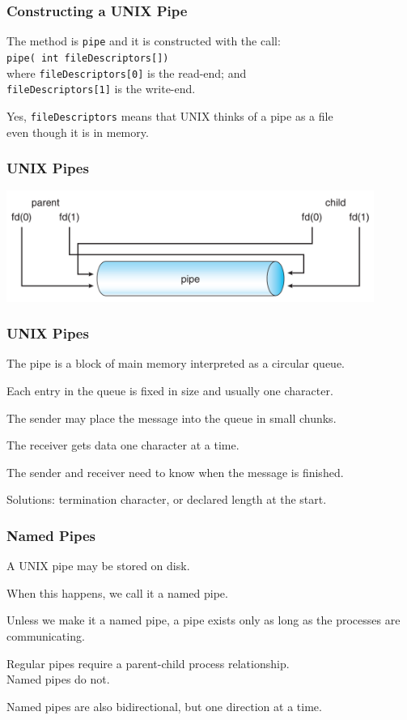 \begin{frame}
	\frametitle{Constructing a UNIX Pipe}

	The method is \texttt{pipe} and it is constructed with the call: \\
	\texttt{pipe( int fileDescriptors[])}\\
	\quad where \texttt{fileDescriptors[0]} is the read-end; and\\
	\quad \texttt{fileDescriptors[1]} is the write-end.

	Yes, \texttt{fileDescriptors} means that UNIX thinks of a pipe as a file\\
	\quad even though it is in memory.


\end{frame}

\begin{frame}
	\frametitle{UNIX Pipes}

	\begin{center}
		\includegraphics[width=0.9\textwidth]{images/unix-pipe.png}
	\end{center}

\end{frame}

\begin{frame}
	\frametitle{UNIX Pipes}

	The pipe is a block of main memory interpreted as a circular queue.

	Each entry in the queue is fixed in size and usually one character.

	The sender may place the message into the queue in small chunks.

	The receiver gets data one character at a time.

	The sender and receiver need to know when the message is finished.

	Solutions: termination character, or declared length at the start.

\end{frame}

\begin{frame}
	\frametitle{Named Pipes}

	A UNIX pipe may be stored on disk.

	When this happens, we call it a \alert{named pipe}.

	Unless we make it a named pipe, a pipe exists only as long as the processes are communicating.

	Regular pipes require a parent-child process relationship.\\
	\quad Named pipes do not.

	Named pipes are also bidirectional, but one direction at a time.

\end{frame}

